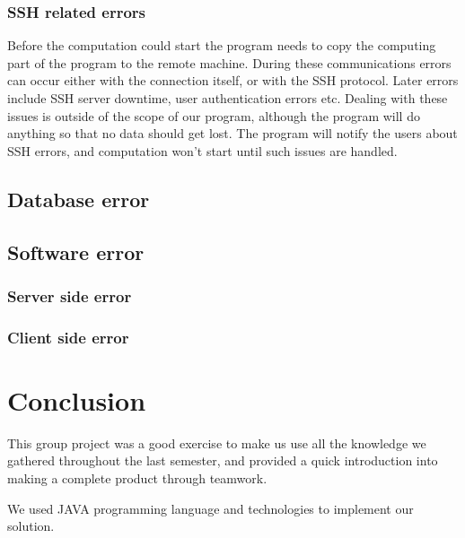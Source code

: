 \documentclass[10pt,a4paper]{report}
\begin{document}
\subsection{SSH related errors}
Before the computation could start the program needs to copy the computing part of the program to the remote machine. During these communications errors can occur either with the connection itself, or with the SSH protocol. Later errors include SSH server downtime, user authentication errors etc. Dealing with these issues is outside of the scope of our program, although the program will do anything so that no data should get lost. The program will notify the users about SSH errors, and computation won't start until such issues are handled.

\section{Database error}


\section{Software error}
\subsection{Server side error}
\subsection{Client side error}

\chapter{Conclusion}
This group project was a good exercise to make us use all the knowledge we gathered throughout the last semester, and provided a quick introduction into making a complete product through teamwork.

We used JAVA programming language and technologies to implement our solution.
\begin{flushleft}
	
	
\end{flushleft}
\end{document}
